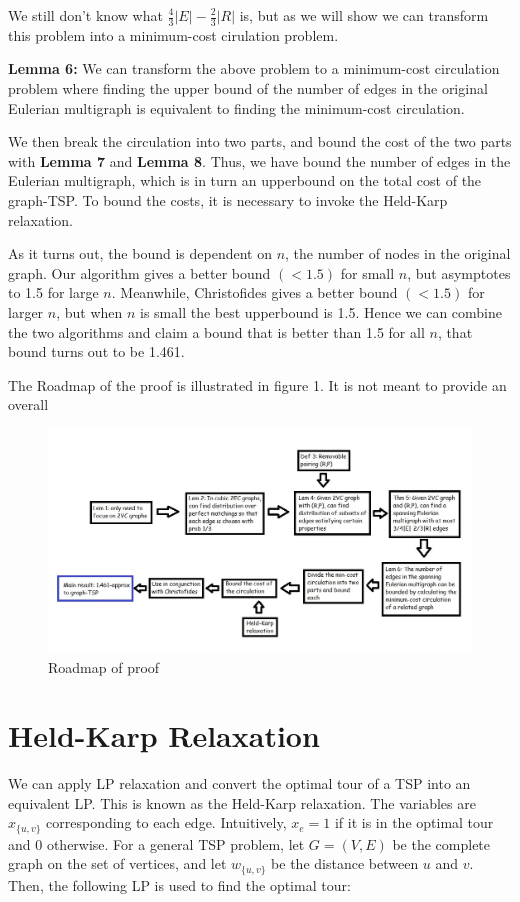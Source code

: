 \documentclass[12pt]{article}
\begin{document}
We still don't know what $\frac{4}{3}|E|-\frac{2}{3}|R|$ is, but as we will show we can transform this problem into a minimum-cost cirulation problem.

{\bf Lemma 6:} We can transform the above problem to a minimum-cost circulation problem where finding the upper bound of the number of edges in the original Eulerian multigraph is equivalent to finding the minimum-cost circulation.

We then break the circulation into two parts, and bound the cost of the two parts with {\bf Lemma 7} and {\bf Lemma 8}. Thus, we have bound the number of edges in the Eulerian multigraph, which is in turn an upperbound on the total cost of the graph-TSP. To bound the costs, it is necessary to invoke the Held-Karp relaxation.

As it turns out, the bound is dependent on $n$, the number of nodes in the original graph. Our algorithm gives a better bound $(<1.5)$ for small $n$, but asymptotes to 1.5 for large $n$. Meanwhile, Christofides gives a better bound $(<1.5)$ for larger $n$, but when $n$ is small the best upperbound is 1.5. Hence we can combine the two algorithms and claim a bound that is better than 1.5 for all $n$, that bound turns out to be 1.461.

The Roadmap of the proof is illustrated in figure 1. It is not meant to provide an overall

\begin{figure}[t]
\includegraphics[width=14cm]{chart.jpg}
\caption{Roadmap of proof}
\end{figure}



\section{Held-Karp Relaxation}
We can apply LP relaxation and convert the optimal tour of a TSP into an equivalent LP. This is known as the Held-Karp relaxation. The variables are $x_{\{u,v\}}$ corresponding to each edge. Intuitively, $x_e=1$ if it is in the optimal tour and $0$ otherwise. For a general TSP problem, let $G=(V,E)$ be the complete graph on the set of vertices, and let $w_{\{u,v\}}$ be the distance between $u$ and $v$. Then, the following LP is used to find the optimal tour:
\end{document}

